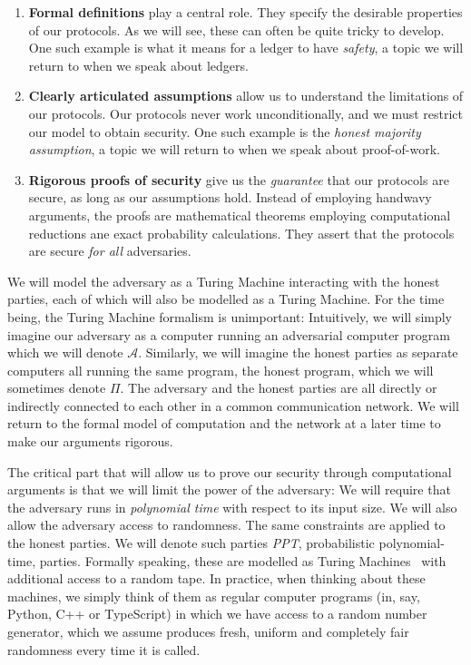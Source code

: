 \begin{enumerate}
  \item \textbf{Formal definitions} play a central role. They specify the
        desirable properties of our protocols. As we will see, these can often
        be quite tricky to develop. One such example is what it means for a
        ledger to have \emph{safety}, a topic we will return to when we speak
        about ledgers.
  \item \textbf{Clearly articulated assumptions} allow us to understand the
        limitations of our protocols. Our protocols never work
        unconditionally, and we must restrict our model to obtain security. One
        such example is the \emph{honest majority assumption}, a topic we will
        return to when we speak about proof-of-work.
  \item \textbf{Rigorous proofs of security} give us the \emph{guarantee} that
        our protocols are secure, as long as our assumptions hold. Instead of
        employing handwavy arguments, the proofs are mathematical theorems
        employing computational reductions ane exact probability calculations.
        They assert that the protocols are secure \emph{for all} adversaries.
\end{enumerate}

We will model the adversary as a Turing Machine interacting
with the honest parties, each of which will also be modelled as a Turing Machine. For the
time being, the Turing Machine formalism is unimportant: Intuitively, we will simply imagine
our adversary as a computer running an adversarial computer program which we will denote $\mathcal{A}$.
Similarly, we will imagine the honest parties as separate computers all running the same program,
the honest program, which we will sometimes denote $\Pi$.
The adversary and the honest parties are
all directly or indirectly connected to each other in a common communication network.
We will return to the formal model of computation and the network at a later time to make
our arguments rigorous.

The critical part that will allow us to prove our security through computational arguments
is that we will limit the power of the adversary: We will require that the adversary runs
in \emph{polynomial time} with respect to its input size. We will also allow the adversary
access to randomness. The same constraints are applied to the honest parties. We will
denote such parties \emph{PPT}, probabilistic polynomial-time, parties. Formally speaking,
these are modelled as Turing Machines~\cite{turing} with additional access to a random tape.
In practice, when thinking about these machines, we simply think of them as regular computer
programs (in, say, Python, C++ or TypeScript) in which we have access to a random number
generator, which we assume produces fresh, uniform and completely fair randomness every time
it is called.

